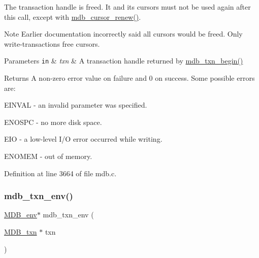 The transaction handle is freed. It and its cursors must not be used again after this call, except with \mbox{\hyperlink{group__mdb_gac8b57befb68793070c85ea813df481af}{mdb\+\_\+cursor\+\_\+renew()}}. \begin{DoxyNote}{Note}
Earlier documentation incorrectly said all cursors would be freed. Only write-\/transactions free cursors. 
\end{DoxyNote}

\begin{DoxyParams}[1]{Parameters}
\mbox{\tt in}  & {\em txn} & A transaction handle returned by \mbox{\hyperlink{group__mdb_gad7ea55da06b77513609efebd44b26920}{mdb\+\_\+txn\+\_\+begin()}} \\
\hline
\end{DoxyParams}
\begin{DoxyReturn}{Returns}
A non-\/zero error value on failure and 0 on success. Some possible errors are\+: 
\begin{DoxyItemize}
\item E\+I\+N\+V\+AL -\/ an invalid parameter was specified. 
\item E\+N\+O\+S\+PC -\/ no more disk space. 
\item E\+IO -\/ a low-\/level I/O error occurred while writing. 
\item E\+N\+O\+M\+EM -\/ out of memory. 
\end{DoxyItemize}
\end{DoxyReturn}


Definition at line 3664 of file mdb.\+c.

\mbox{\label{group__internal_gaeb17735b8aaa2938a78a45cab85c06a0}} 
\subsubsection{\texorpdfstring{mdb\+\_\+txn\+\_\+env()}{mdb\_txn\_env()}}
{\footnotesize\ttfamily \mbox{\hyperlink{struct_m_d_b__env}{M\+D\+B\+\_\+env}}$\ast$ mdb\+\_\+txn\+\_\+env (\begin{DoxyParamCaption}\item[{\mbox{\hyperlink{struct_m_d_b__txn}{M\+D\+B\+\_\+txn}} $\ast$}]{txn }\end{DoxyParamCaption})}



